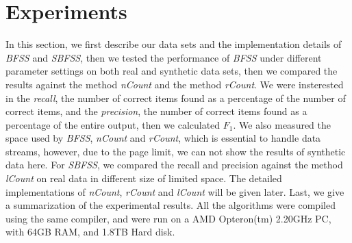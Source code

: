 \documentclass[conference]{IEEEtran}
\begin{document}
\section{Experiments}
In this section, we first describe our data sets and the implementation details of \emph{BFSS} and \emph{SBFSS}, then we tested the performance of \emph{BFSS} under different parameter settings on both real and synthetic data sets, then we compared the results against the method \emph{nCount} and the method \emph{rCount}. We were insterested in the \emph{recall}, the number of correct items found as a percentage of the number of correct items, and the \emph{precision}, the number of correct items found as a percentage of the entire output, then we calculated $F_1$. We also measured the space used by \emph{BFSS}, \emph{nCount} and \emph{rCount}, which is essential to handle data streams, however, due to the page limit, we can not show the results of synthetic data here. For \emph{SBFSS}, we compared the recall and precision against the method \emph{lCount} on real data in different size of limited space. The detailed implementations of \emph{nCount}, \emph{rCount} and \emph{lCount} will be given later. Last, we give a summarization of the experimental results. All the algorithms were compiled using the same compiler, and were run on a AMD Opteron(tm) 2.20GHz PC, with 64GB RAM, and 1.8TB Hard disk.\par
\end{document}
